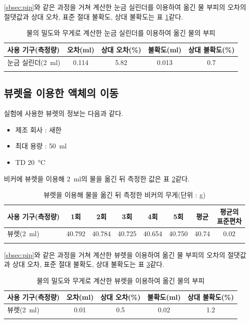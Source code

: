 \documentclass{GSHS-chemexp}
\begin{document}
	\ref{sbsec:pip}와 같은 과정을 거쳐 계산한 눈금 실린더를 이용하여 옮긴
	물 부피의 오차의 절댓값과 상대 오차, 표준 절대 불확도, 상대 불확도는
	표 \ref{tab:calc2}\과 같다.
	
	\begin{table}[H]
		\centering
		\begin{tabular}{l c c c c}
			\thickhline
			사용 기구(측정량) &
			오차(\si{\milli\litre}) &
			상대 오차(\%) &
			불확도(\si{\milli\litre}) &
			상대 불확도(\%) \\
			\hline
			눈금 실린더(\SI{2}{\milli\litre}) &
			0.114 & 5.82 & 0.013 & 0.7 \\
			\thickhline
		\end{tabular}
		\caption{물의 밀도와 무게로 계산한
			눈금 실린더를 이용하여 옮긴 물의 부피}
		\label{tab:calc2}
	\end{table}
	
	\subsection{뷰렛을 이용한 액체의 이동}
	실험에 사용한 뷰렛의 정보는 다음과 같다.
	\begin{itemize}
		\item 제조 회사 : 새한
		\item 최대 용량 : \SI{50}{\milli\litre}
		\item TD \SI{20}{\degreeCelsius}
	\end{itemize}
	
	비커에 뷰렛을 이용해 \SI{2}{\milli\litre}의 물을 옮긴 뒤 측정한 값은
	표 \ref{tab:data3}\과 같다.
	\begin{table}[H]
		\centering
		\begin{tabular}{l c c c c c c c}
			\thickhline
			사용 기구(측정량) & 1회 & 2회 & 3회 & 4회 & 5회 &
			평균 & \makecell{평균의\\표준편차} \\
			\hline
			뷰렛(\SI{2}{\milli\litre}) &
			40.792 & 40.784 & 40.725 & 40.654 & 40.750 & 40.74 & 0.02 \\
			\thickhline
		\end{tabular}
		\caption{뷰렛을 이용해 물을 옮긴 뒤 측정한
			비커의 무게(단위 : \si{\gram})}
		\label{tab:data3}
	\end{table}
	
	\ref{sbsec:pip}와 같은 과정을 거쳐 계산한 뷰렛을 이용하여 옮긴
	물 부피의 오차의 절댓값과 상대 오차, 표준 절대 불확도, 상대 불확도는
	표 \ref{tab:calc3}\과 같다.
	
	\begin{table}[H]
		\centering
		\begin{tabular}{l c c c c}
			\thickhline
			사용 기구(측정량) &
			오차(\si{\milli\litre}) &
			상대 오차(\%) &
			불확도(\si{\milli\litre}) &
			상대 불확도(\%) \\
			\hline
			뷰렛(\SI{2}{\milli\litre}) &
			0.01 & 0.5 & 0.02 & 1.2 \\
			\thickhline
		\end{tabular}
		\caption{물의 밀도와 무게로 계산한 뷰렛을 이용하여 옮긴 물의 부피}
		\label{tab:calc3}
	\end{table}
	
\end{document}
